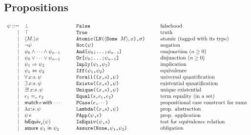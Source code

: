 \documentclass[12pt]{article}
\newcommand{\M}{M}
\newcommand{\e}{e}
\newcommand{\s}{s}
\newcommand{\n}{x} %
\newcommand{\p}{\psi} %
\newcommand{\pt}{\sigma} %
\newcommand{\x}{\n} %
\newcommand{\pFalse}{\bot}
\newcommand{\pTrue}{\top}
\newcommand{\pNot}[1]{\lnot #1}
\newcommand{\pAnd}[2]{#1_0\wedge\cdots\wedge #1_{#2}}
\newcommand{\pOr}[2]{#1_0\vee\cdots\vee #1_{#2}}
\newcommand{\pImply}[2]{#1 \Rightarrow #2}
\newcommand{\pEquiv}[2]{#1 \Leftrightarrow #2}
\newcommand{\pForall}[3]{\forall\, #1{:}#2.\,#3}
\newcommand{\pExists}[3]{\exists\, #1{:}#2.\,#3}
\newcommand{\pUnique}[3]{\exists!\, #1{:}#2\,.#3}
\newcommand{\pAssure}[2]{\mathsf{assure}\ #1\ \mathsf{in}\ #2}
\newcommand{\pEqual}[3]{#1 =_{#3} #2}
\newcommand{\pLambda}[3]{\lambda #1{:}#2.\,#3}
\newcommand{\pApp}[2]{#1\,#2}
\newcommand{\pIsEquiv}[2]{\mathsf{IsEquiv}_{#2}(#1)}
\begin{document}
\subsection{Propositions}
\[
\begin{array}{rl@{\hspace{1cm}}l@{\hspace{1cm}}l}
\p ::= & \pFalse & \texttt{False} & \mbox{falsehood}\\
 |&\pTrue & \texttt{True} & \mbox{truth} \\
 |&\langle\M.\rangle\n & \texttt{Atomic(LN($\langle$Some $\M\rangle,\n$),$\pt$)} & \mbox{atomic (tagged with its type)}\\
 |&\pNot{\p}&\texttt{Not($\p$)}&\mbox{negation}\\
 |&\pAnd{\p}{n-1}&\texttt{And[$\p_0$;\ldots;$\p_{n-1}$]} & \mbox{conjunction ($n\geq 0$)}\\
 |&\pOr{\p}{n-1}& \texttt{Or[$\p_0$;\ldots;$\p_{n-1}$]} & \mbox{disjunction ($n\geq 0$)}\\
 |&\pImply{\p_1}{\p_2}& \texttt{Imply($\p_1$,$\p_2$)} & \mbox{implication}\\
 |&\pEquiv{\p_1}{\p_2}& \texttt{Iff($\p_1$,$\p_2$)} & \mbox{equivalence}\\
 |&\pForall{\x}{\s}{\p}&\texttt{Forall(($\x$,$\s$),$\p$)} & \mbox{universal quantification}\\
 |&\pExists{\x}{\s}{\p}&\texttt{Exists(($\x$,$\s$),$\p$)} & \mbox{existential quantification}\\
 |&\pUnique{\x}{\s}{\p}&\texttt{Unique(($\x$,$\s$),$\p$)} & \mbox{unique existential}\\
 |&\pEqual{\e_1}{\e_2}{\s}& \texttt{Equal($\s$,$\e_1$,$\e_2$)} & \mbox{term equality (in a set)}\\
 |&\mathsf{match}\,\e\,\mathsf{with}\,\cdots & 
 \texttt{PCase($\e$,$\cdots$)} & \mbox{propositional case construct for sums}\\
 |&\pLambda{\x}{\s}{\p}&\texttt{Lambda(($\x$,$\s$),$\p$)} & \mbox{prop. abstraction}\\
 |&\pApp{\p}{\e}&\texttt{PApp($\p$,$\e$)} & \mbox{prop. application}\\
 |&\pIsEquiv{\p}{\s}& \texttt{IsEquiv($\p$,$\s$)} & \mbox{test for equivalence relation}\\
 |&\pAssure{\p_1}{\p_2}&\texttt{Assure(None,$\p_1$,$\p_2$)} & \mbox{obligation}\\
\end{array}
\]
\end{document}
